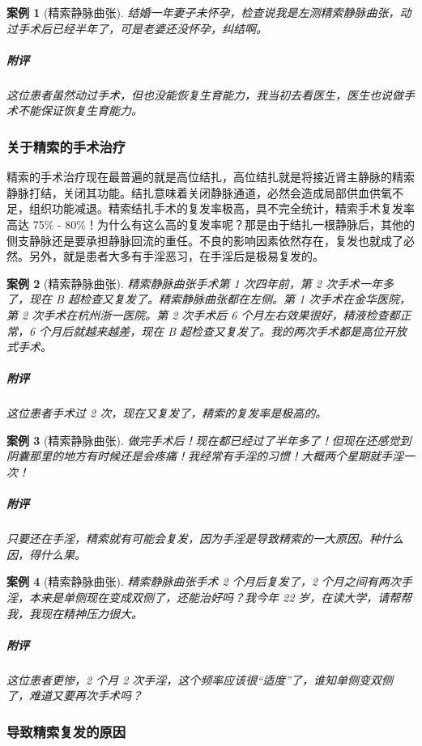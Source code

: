 \documentclass{ctexart}
\newtheorem{case}{案例}
\begin{document}
\begin{case}[精索静脉曲张]
    结婚一年妻子未怀孕，检查说我是左测精索静脉曲张，动过手术后已经半年了，可是老婆还没怀孕，纠结啊。
    \subparagraph{附评} 这位患者虽然动过手术，但也没能恢复生育能力，我当初去看医生，医生也说做手术不能保证恢复生育能力。
\end{case}

\subsubsection{关于精索的手术治疗}

精索的手术治疗现在最普遍的就是高位结扎，高位结扎就是将接近肾主静脉的精索静脉打结，关闭其功能。结扎意味着关闭静脉通道，必然会造成局部供血供氧不足，组织功能减退。精索结扎手术的复发率极高，具不完全统计，精索手术复发率高达 75\% - 80\%！为什么有这么高的复发率呢？那是由于结扎一根静脉后，其他的侧支静脉还是要承担静脉回流的重任。不良的影响因素依然存在，复发也就成了必然。另外，就是患者大多有手淫恶习，在手淫后是极易复发的。

\begin{case}[精索静脉曲张]
    精索静脉曲张手术第 1 次四年前，第 2 次手术一年多了，现在 B 超检查又复发了。精索静脉曲张都在左侧。第 1 次手术在金华医院，第 2 次手术在杭州浙一医院。第 2 次手术后 6 个月左右效果很好，精液检查都正常，6 个月后就越来越差，现在 B 超检查又复发了。我的两次手术都是高位开放式手术。
    \subparagraph{附评} 这位患者手术过 2 次，现在又复发了，精索的复发率是极高的。
\end{case}

\begin{case}[精索静脉曲张]
    做完手术后！现在都已经过了半年多了！但现在还感觉到阴囊那里的地方有时候还是会疼痛！我经常有手淫的习惯！大概两个星期就手淫一次！
    \subparagraph{附评} 只要还在手淫，精索就有可能会复发，因为手淫是导致精索的一大原因。种什么因，得什么果。
\end{case}

\begin{case}[精索静脉曲张]
    精索静脉曲张手术 2 个月后复发了，2 个月之间有两次手淫，本来是单侧现在变成双侧了，还能治好吗？我今年 22 岁，在读大学，请帮帮我，我现在精神压力很大。
    \subparagraph{附评} 这位患者更惨，2 个月 2 次手淫，这个频率应该很“适度”了，谁知单侧变双侧了，难道又要再次手术吗？
\end{case}

\subsubsection{导致精索复发的原因}
\end{document}
